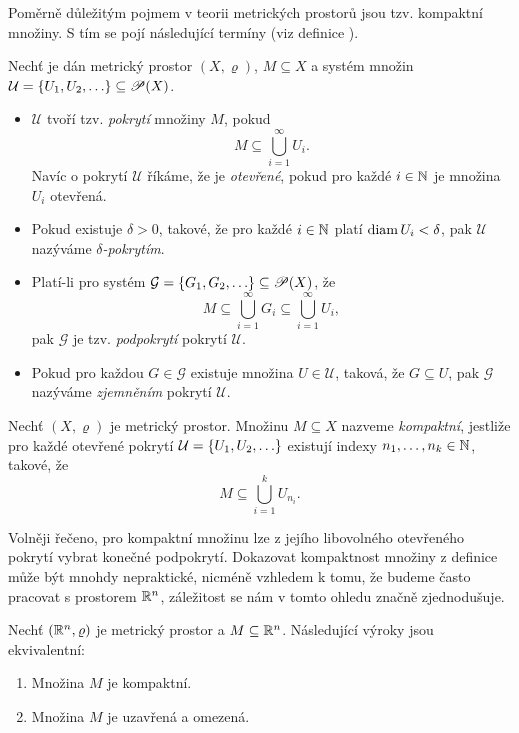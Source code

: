 Poměrně důležitým pojmem v teorii metrických prostorů jsou tzv. kompaktní množiny. S tím se pojí následující termíny (viz definice ).
\begin{definition}\label{def:delta-pokryti-zjemneni}
    Nechť je dán metrický prostor $(X,\varrho)$, $M\subseteq X$ a systém množin $\mathcal{U}=\left\{U_1,U_2,\ldots\right\}\subseteq\mathscr{P}(X)$.
    \begin{itemize}
        \item $\mathcal{U}$ tvoří tzv. \emph{pokrytí} množiny $M$, pokud
        \[M\subseteq\bigcup_{i=1}^\infty U_i.\]
        Navíc o pokrytí $\mathcal{U}$ říkáme, že je \emph{otevřené}, pokud pro každé $i\in\mathbb{N}$ je množina $U_i$ otevřená.
        \item Pokud existuje $\delta>0$, takové, že pro každé $i\in\mathbb{N}$ platí $\operatorname{diam}{U_i}<\delta$, pak $\mathcal{U}$ nazýváme \emph{$\delta$-pokrytím}.
        \item Platí-li pro systém $\mathcal{G}=\left\{G_1,G_2,\ldots\right\}\subseteq\mathscr{P}(X)$, že
        \[M\subseteq\bigcup_{i=1}^\infty G_i\subseteq\bigcup_{i=1}^\infty U_i,\]
        pak $\mathcal{G}$ je tzv. \emph{podpokrytí} pokrytí $\mathcal{U}$.
        \item Pokud pro každou $G\in\mathcal{G}$ existuje množina $U\in\mathcal{U}$, taková, že $G\subseteq U$, pak $\mathcal{G}$ nazýváme \emph{zjemněním} pokrytí $\mathcal{U}$. 
    \end{itemize}
\end{definition}
\begin{definition}\label{def:kompaktni-mnozina}
    Nechť $(X,\varrho)$ je metrický prostor. Množinu $M\subseteq X$ nazveme \emph{kompaktní}, jestliže pro každé otevřené pokrytí $\mathcal{U}=\left\{U_1,U_2,\ldots\right\}$ existují indexy $n_1,\ldots,n_k\in\mathbb{N}$, takové, že
    \[M\subseteq\bigcup_{i=1}^k U_{n_i}.\]
\end{definition}
Volněji řečeno, pro kompaktní množinu lze z jejího libovolného otevřeného pokrytí vybrat konečné podpokrytí. Dokazovat kompaktnost množiny z definice může být mnohdy nepraktické, nicméně vzhledem k tomu, že budeme často pracovat s prostorem $\mathbb{R}^n$, záležitost se nám v tomto ohledu značně zjednodušuje.
\begin{theorem}\label{thm:heine-borel}
    Nechť $(\mathbb{R}^n,\varrho)$ je metrický prostor a $M\subseteq\mathbb{R}^n$. Následující výroky jsou ekvivalentní:
    \begin{enumerate}[label=(\roman*)]
        \item Množina $M$ je kompaktní.
        \item Množina $M$ je uzavřená a omezená.
    \end{enumerate}
\end{theorem}
